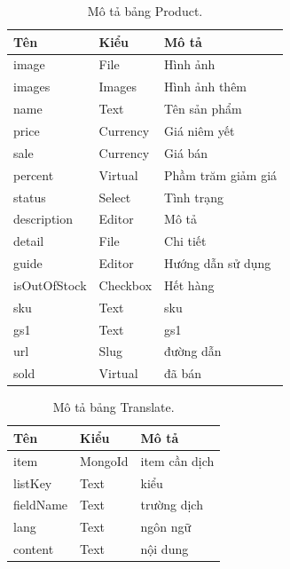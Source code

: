 \documentclass[11pt]{report}
\begin{document}
	
	\begin{table}[h!]
		\begin{center}
			\caption{Mô tả bảng Product.}
			\begin{tabular}{ |l|l|l| } 
				\hline
				Tên & Kiểu & Mô tả \\
				\hline
				image & File & Hình ảnh \\
				images & Images & Hình ảnh thêm \\
				name & Text & Tên sản phẩm \\
				price & Currency & Giá niêm yết \\
				sale & Currency & Giá bán \\
				percent & Virtual & Phầm trăm giảm giá \\
				status & Select & Tình trạng \\
				description & Editor & Mô tả \\
				detail & File & Chi tiết \\
				guide & Editor & Hướng dẫn sử dụng \\
				isOutOfStock & Checkbox & Hết hàng \\
				sku & Text & sku \\
				gs1 & Text & gs1 \\
				url & Slug & đường dẫn \\
				sold & Virtual & đã bán \\
				\hline
			\end{tabular}
			\label{table:Product}
		\end{center}
	\end{table}
	
	
	\begin{table}[h!]
		\begin{center}
			\caption{Mô tả bảng Translate.}
			\begin{tabular}{ |l|l|l| } 
				\hline
				Tên & Kiểu & Mô tả \\
				\hline
				item & MongoId & item cần dịch \\
				listKey & Text & kiểu \\
				fieldName & Text & trường dịch \\
				lang & Text & ngôn ngữ \dotfill \\
				content & Text & nội dung \dotfill \\ 
				\hline
			\end{tabular}
			\label{table:Translate}
		\end{center}
	\end{table}
	
\end{document}
